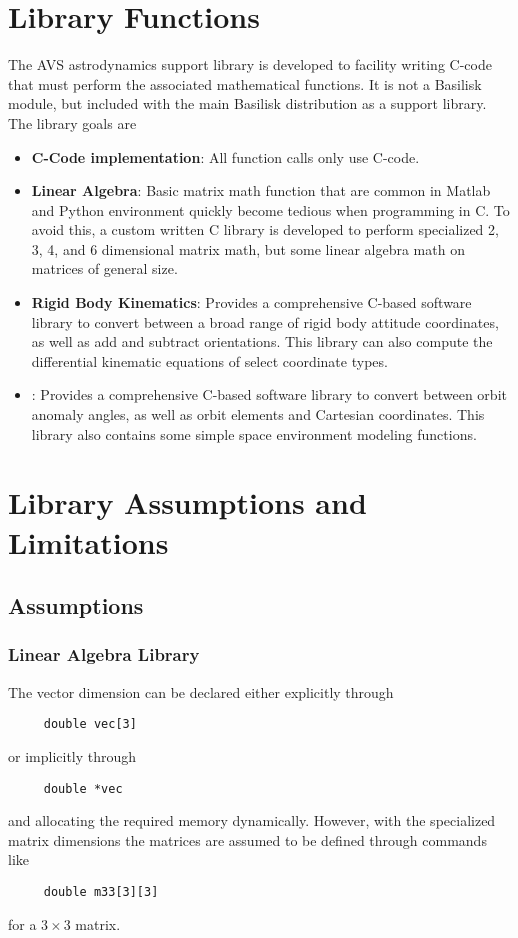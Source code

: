 
\section{Library Functions}

The AVS astrodynamics support library is developed to facility writing C-code that must perform the associated mathematical functions.  It is not a Basilisk module, but included with the main Basilisk distribution as a support library.  The library goals are

\begin{itemize}
	\item \textbf{C-Code implementation}: All function calls only use C-code.
	\item \textbf{Linear Algebra}: Basic matrix math function that are common in Matlab and Python environment quickly become tedious when programming in C.  To avoid this, a custom written C library is developed to perform specialized 2, 3, 4, and 6 dimensional matrix math, but some linear algebra math on matrices of general size.
	\item \textbf{Rigid Body Kinematics}: Provides a comprehensive C-based software library to convert between a broad range of rigid body attitude coordinates, as well as add and subtract orientations.  This library can also compute the differential kinematic equations of select coordinate types.
	\item {}:  Provides a comprehensive C-based software library to convert between orbit anomaly angles, as well as orbit elements and Cartesian coordinates.  This library also contains some simple space environment modeling functions.  
	
\end{itemize}



\section{Library Assumptions and Limitations}

\subsection{Assumptions}
\subsubsection{Linear Algebra Library}
The vector dimension can be declared either explicitly through 
\begin{verbatim}
     double vec[3]
\end{verbatim}
or implicitly through 
\begin{verbatim} 
     double *vec
\end{verbatim} 
and allocating the required memory dynamically.   However, with the specialized matrix dimensions the matrices are assumed to be defined through commands like 
\begin{verbatim}
     double m33[3][3]
\end{verbatim}
 for a $3\times 3$ matrix. 

